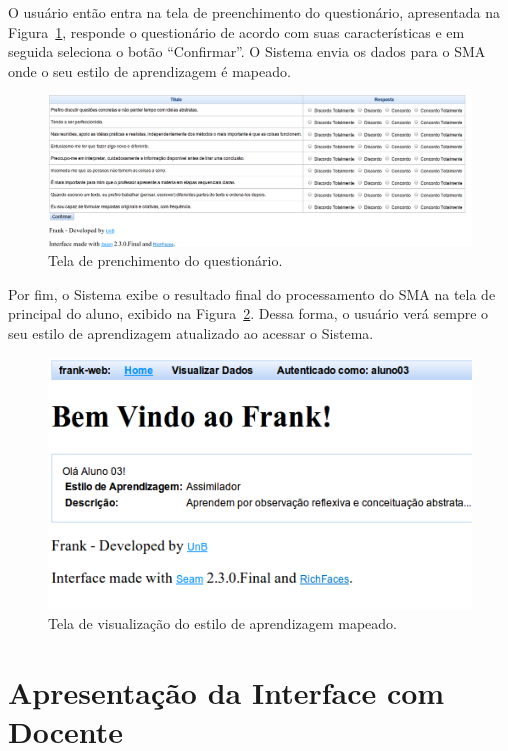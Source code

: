 O usuário então entra na tela de preenchimento do questionário, apresentada na Figura~\ref{fig:frank-tela-aluno-preencher-questionario}, responde o questionário de acordo com suas características e em seguida seleciona o botão ``Confirmar''. O Sistema envia os dados para o SMA onde o seu estilo de aprendizagem é mapeado.

\begin{figure}
	\centering
	\includegraphics[scale=0.4]{images/frank-tela-aluno-preencher-questionario.png}
	\caption{Tela de prenchimento do questionário.}
	\label{fig:frank-tela-aluno-preencher-questionario}
\end{figure}

Por fim, o Sistema exibe o resultado final do processamento do SMA na tela de principal do aluno, exibido na Figura~\ref{fig:frank-tela-aluno-inferencia-estilo}. Dessa forma, o usuário verá sempre o seu estilo de aprendizagem atualizado ao acessar o Sistema.

\begin{figure}
	\centering
	\includegraphics[scale=0.6]{images/frank-tela-aluno-inferencia-estilo.png}
	\caption{Tela de visualização do estilo de aprendizagem mapeado.}
	\label{fig:frank-tela-aluno-inferencia-estilo}
\end{figure}

\section{Apresentação da Interface com Docente}\label{section:interface-docente}

